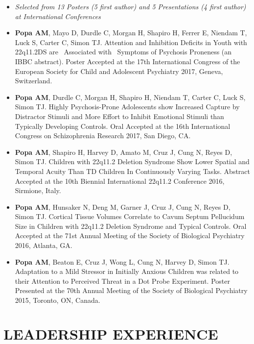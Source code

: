 \documentclass[line,margin,10pt]{res}
\begin{document}
\begin{resume}
\begin{itemize} \itemsep -2pt
\item [] {\sl Selected from 13 Posters (5 first author) and 5 Presentations (4 first author) at International Conferences}\\
\item \textbf{Popa AM}, Mayo D, Durdle C, Morgan H, Shapiro H, Ferrer E, Niendam T, Luck S, Carter C, Simon TJ. Attention and Inhibition Deficits in Youth with 22q11.2DS are  Associated with  Symptoms of Psychosis Proneness (an IBBC abstract). Poster Accepted at the 17th International Congress of the European Society for Child and Adolescent Psychiatry 2017, Geneva, Switzerland.
\item \textbf{Popa AM}, Durdle C, Morgan H, Shapiro H, Niendam T, Carter C, Luck S, Simon TJ. Highly Psychosis-Prone Adolescents show Increased Capture by Distractor Stimuli and More Effort to Inhibit Emotional Stimuli than Typically Developing Controls. Oral Accepted at the 16th International Congress on Schizophrenia Research 2017, San Diego, CA.
\item \textbf{Popa AM}, Shapiro H, Harvey D, Amato M, Cruz J, Cung N, Reyes D, Simon TJ. Children with 22q11.2 Deletion Syndrome Show Lower Spatial and Temporal Acuity Than TD Children In Continuously Varying Tasks. Abstract Accepted at the 10th Biennial International 22q11.2 Conference 2016, Sirmione, Italy.
\item \textbf{Popa AM}, Hunsaker N, Deng M, Garner J, Cruz J, Cung N, Reyes D, Simon TJ. Cortical Tissue Volumes Correlate to Cavum Septum Pellucidum Size in Children with 22q11.2 Deletion Syndrome and Typical Controls. Oral Accepted at the 71st Annual Meeting of the Society of Biological Psychiatry 2016, Atlanta, GA.
\item \textbf{Popa AM}, Beaton E, Cruz J, Wong L, Cung N, Harvey D, Simon TJ. Adaptation to a Mild Stressor in Initially Anxious Children was related to their Attention to Perceived Threat in a Dot Probe Experiment. Poster Presented at the 70th Annual Meeting of the Society of Biological Psychiatry 2015, Toronto, ON, Canada.
\end{itemize}

 \section{LEADERSHIP EXPERIENCE}
 

\end{resume}
\end{document}
